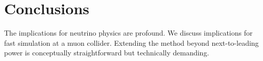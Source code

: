\section{Conclusions}\label{sec:conclusions}

The implications for neutrino physics are profound. We discuss
implications for fast simulation at a muon collider. Extending the
method beyond next-to-leading power is conceptually straightforward but
technically demanding.

